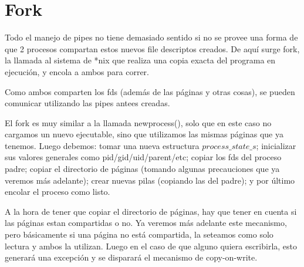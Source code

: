 \section{Fork}

Todo el manejo de pipes no tiene demasiado sentido si no se provee una forma de
que 2 procesos compartan estos nuevos file descriptos creados. De aquí surge
fork, la llamada al sistema de *nix que realiza una copia exacta del programa
en ejecución, y encola a ambos para correr.

Como ambos comparten los fds (además de las páginas y otras cosas), se pueden
comunicar utilizando las pipes antees creadas.

El fork es muy similar a la llamada newprocess(), solo que en este caso no
cargamos un nuevo ejecutable, sino que utilizamos las mismas páginas que ya
tenemos. Luego debemos: tomar una nueva estructura $process\_state\_s$;
inicializar sus valores generales como pid/gid/uid/parent/etc; copiar los fds
del proceso padre; copiar el directorio de páginas (tomando algunas
precauciones que ya veremos más adelante); crear nuevas pilas (copiando las del
padre); y por último encolar el proceso como listo.

A la hora de tener que copiar el directorio de páginas, hay que tener en cuenta
si las páginas estan compartidas o no. Ya veremos más adelante este mecanismo,
pero básicamente si una página no está compartida, la seteamos como solo
lectura y ambos la utilizan. Luego en el caso de que alguno quiera escribirla,
esto generará una excepción y se disparará el mecanismo de copy-on-write.
